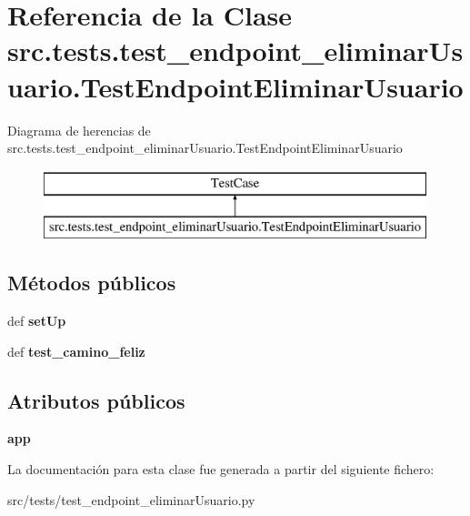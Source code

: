 \hypertarget{classsrc_1_1tests_1_1test__endpoint__eliminar_usuario_1_1_test_endpoint_eliminar_usuario}{\section{Referencia de la Clase src.\-tests.\-test\-\_\-endpoint\-\_\-eliminar\-Usuario.\-Test\-Endpoint\-Eliminar\-Usuario}
\label{classsrc_1_1tests_1_1test__endpoint__eliminar_usuario_1_1_test_endpoint_eliminar_usuario}
}
Diagrama de herencias de src.\-tests.\-test\-\_\-endpoint\-\_\-eliminar\-Usuario.\-Test\-Endpoint\-Eliminar\-Usuario\begin{figure}[H]
\begin{center}
\leavevmode
\includegraphics[height=2.000000cm]{classsrc_1_1tests_1_1test__endpoint__eliminar_usuario_1_1_test_endpoint_eliminar_usuario}
\end{center}
\end{figure}
\subsection*{Métodos públicos}
\begin{DoxyCompactItemize}
\item 
\hypertarget{classsrc_1_1tests_1_1test__endpoint__eliminar_usuario_1_1_test_endpoint_eliminar_usuario_a75eb5e1d05a4ab0b994180d94dec53e6}{def {\bfseries set\-Up}}\label{classsrc_1_1tests_1_1test__endpoint__eliminar_usuario_1_1_test_endpoint_eliminar_usuario_a75eb5e1d05a4ab0b994180d94dec53e6}

\item 
\hypertarget{classsrc_1_1tests_1_1test__endpoint__eliminar_usuario_1_1_test_endpoint_eliminar_usuario_aacaf2d187c49ccbffbffc13524840b3f}{def {\bfseries test\-\_\-camino\-\_\-feliz}}\label{classsrc_1_1tests_1_1test__endpoint__eliminar_usuario_1_1_test_endpoint_eliminar_usuario_aacaf2d187c49ccbffbffc13524840b3f}

\end{DoxyCompactItemize}
\subsection*{Atributos públicos}
\begin{DoxyCompactItemize}
\item 
\hypertarget{classsrc_1_1tests_1_1test__endpoint__eliminar_usuario_1_1_test_endpoint_eliminar_usuario_a288c28964e86eba0a944d8f61a0435ff}{{\bfseries app}}\label{classsrc_1_1tests_1_1test__endpoint__eliminar_usuario_1_1_test_endpoint_eliminar_usuario_a288c28964e86eba0a944d8f61a0435ff}

\end{DoxyCompactItemize}


La documentación para esta clase fue generada a partir del siguiente fichero\-:\begin{DoxyCompactItemize}
\item 
src/tests/test\-\_\-endpoint\-\_\-eliminar\-Usuario.\-py\end{DoxyCompactItemize}

